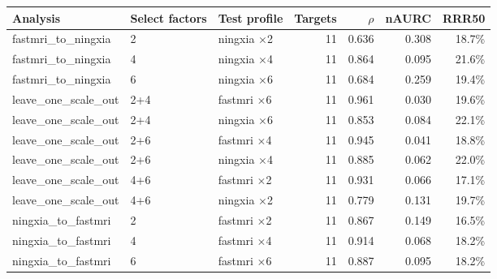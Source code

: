 \begin{tabular}{lllrrrr}
\toprule
Analysis & Select factors & Test profile & Targets & $\rho$ & nAURC & RRR50 \\
\midrule
fastmri\_to\_ningxia & 2 & ningxia $\times$2 & 11 & 0.636 & 0.308 & 18.7\% \\
fastmri\_to\_ningxia & 4 & ningxia $\times$4 & 11 & 0.864 & 0.095 & 21.6\% \\
fastmri\_to\_ningxia & 6 & ningxia $\times$6 & 11 & 0.684 & 0.259 & 19.4\% \\
leave\_one\_scale\_out & 2+4 & fastmri $\times$6 & 11 & 0.961 & 0.030 & 19.6\% \\
leave\_one\_scale\_out & 2+4 & ningxia $\times$6 & 11 & 0.853 & 0.084 & 22.1\% \\
leave\_one\_scale\_out & 2+6 & fastmri $\times$4 & 11 & 0.945 & 0.041 & 18.8\% \\
leave\_one\_scale\_out & 2+6 & ningxia $\times$4 & 11 & 0.885 & 0.062 & 22.0\% \\
leave\_one\_scale\_out & 4+6 & fastmri $\times$2 & 11 & 0.931 & 0.066 & 17.1\% \\
leave\_one\_scale\_out & 4+6 & ningxia $\times$2 & 11 & 0.779 & 0.131 & 19.7\% \\
ningxia\_to\_fastmri & 2 & fastmri $\times$2 & 11 & 0.867 & 0.149 & 16.5\% \\
ningxia\_to\_fastmri & 4 & fastmri $\times$4 & 11 & 0.914 & 0.068 & 18.2\% \\
ningxia\_to\_fastmri & 6 & fastmri $\times$6 & 11 & 0.887 & 0.095 & 18.2\% \\
\bottomrule
\end{tabular}
